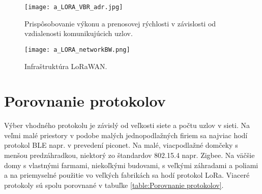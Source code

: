 \documentclass[12pt,a4paper,oneside,openright]{report}
\begin{document}
\begin{figure*}[!htb]
	\centering
	\texttt{[image: a\_LORA\_VBR\_adr.jpg]}
	\caption{Prispôsobovanie výkonu a prenosovej rýchlosti v závislosti od vzdialenosti komunikujúcich uzlov.\cite{LoRa_VBR}}
	\label{f:a_LoRa_ADR}
\end{figure*}

\begin{figure*}[!htb]
	\centering
	\texttt{[image: a\_LORA\_networkBW.png]}
	\caption{Infraštruktúra LoRaWAN\cite{LoRa}.}
	\label{f:a_LoRa_Architecture}
\end{figure*}

\section{Porovnanie protokolov}
Výber vhodného protokolu je závislý od veľkosti siete a počtu uzlov v sieti. Na veľmi malé priestory v podobe malých jednopodlažných firiem sa najviac hodí protokol BLE napr. v prevedení piconet.
Na malé, viacpodlažné domčeky s menšou predzáhradkou, niektorý zo štandardov 802.15.4 napr. Zigbee.
Na väčšie domy s vlastnými farmami, niekoľkými budovami, s veľkými záhradami a poliami a na priemyselné použitie vo veľkých fabrikách sa hodí protokol LoRa.
Viaceré protokoly sú spolu porovnané v tabuľke \ref{table:Porovnanie protokolov}.
\end{document}
